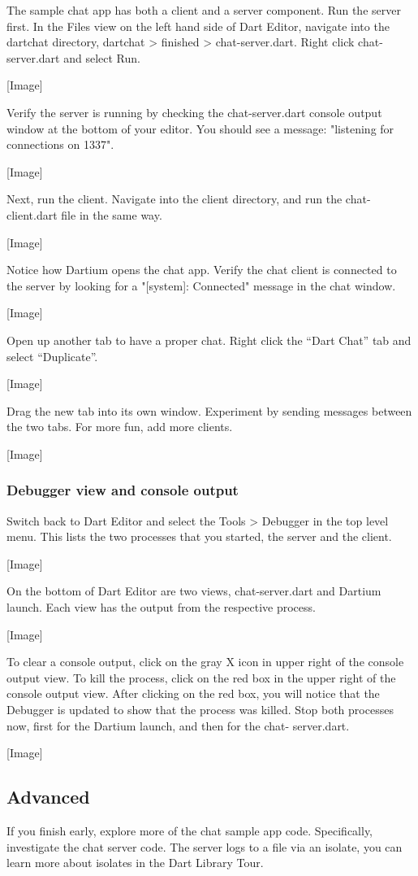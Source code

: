 The sample chat app has both a client and a server component.
Run the server first. In the Files view on the left hand side of Dart Editor, navigate into the dartchat directory, dartchat > finished > chat-server.dart. Right click chat-server.dart and select Run.

[Image]

Verify the server is running by checking the chat-server.dart console output window at the bottom of your editor. You should see a message: "listening for connections on 1337".

[Image]

Next, run the client. Navigate into the client directory, and run the chat-client.dart file in the same way.

[Image]

Notice how Dartium opens the chat app. Verify the chat client is connected to the server by looking for a "[system]: Connected" message in the chat window.

[Image]

Open up another tab to have a proper chat. Right click the “Dart Chat” tab and
select “Duplicate”.

[Image]

Drag the new tab into its own window. Experiment by sending messages between the two tabs.
For more fun, add more clients.

[Image]

\subsubsection{Debugger view and console output}

Switch back to Dart Editor and select the Tools > Debugger in the top level menu. This lists the two processes that you started, the server and the client.

[Image]

On the bottom of Dart Editor are two views, chat-server.dart and Dartium launch. Each view has the output from the respective process.

[Image]

To clear a console output, click on the gray X icon in upper right of the console output view. To kill the process, click on the red box in the upper right of the console output view. After clicking on the red box, you will notice that the Debugger is updated to show that the process was killed.
Stop both processes now, first for the Dartium launch, and then for the chat-
server.dart.

[Image]

\subsection{Advanced}

If you finish early, explore more of the chat sample app code. Specifically, investigate the chat server code. The server logs to a file via an isolate, you can learn more about isolates in the Dart Library Tour.
